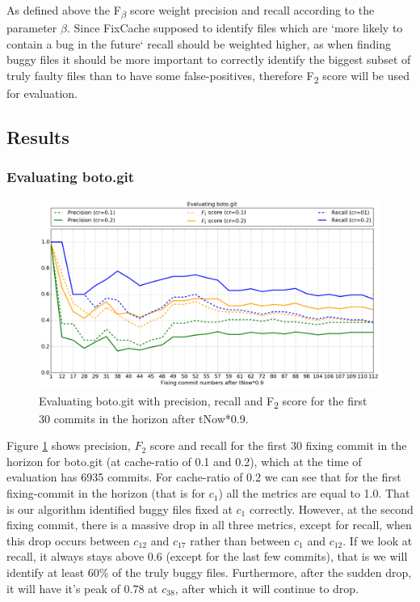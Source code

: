 \documentclass[12pt,twoside,notitlepage]{report}
\newcommand{\fxch}{FixCache}
\begin{document}
As defined above the F\textsubscript{$\beta$} score weight precision and recall according to the parameter $\beta$. Since \fxch{} supposed to identify files which are `more likely to contain a bug in the future` recall should be weighted higher, as when finding buggy files it should be more important to correctly identify the biggest subset of truly faulty files than to have some false-positives, therefore F\textsubscript{2} score will be used for evaluation.
\subsection{Results}
\subsubsection{Evaluating boto.git}
\begin{figure}[ht!]
\includegraphics[width=1.0\textwidth]{evaluating_boto.png}
\caption[Evaluating boto.git: recall, precision and $F_2$ score]{Evaluating boto.git with precision, recall and F\textsubscript{2} score for the first 30 commits in the horizon after tNow*0.9.}
\label{evaluating_boto}
\end{figure}
Figure \ref{evaluating_boto} shows precision, $F_2$ score and recall for the first 30 fixing commit in the horizon for boto.git (at cache-ratio of 0.1 and 0.2), which at the time of evaluation has 6935 commits. For cache-ratio of 0.2 we can see that for the first fixing-commit in the horizon (that is for $c_1$) all the metrics are equal to 1.0. That is our algorithm identified buggy files fixed at $c_1$ correctly. However, at the second fixing commit, there is a massive drop in all three metrics, except for recall, when this drop occurs between $c_{12}$ and $c_{17}$ rather than between $c_1$ and $c_{12}$. If we look at recall, it always stays above 0.6 (except for the last few commits), that is we will identify at least 60\% of the truly buggy files. Furthermore, after the sudden drop, it will have it's peak of 0.78 at $c_{38}$, after which it will continue to drop.
\end{document}
